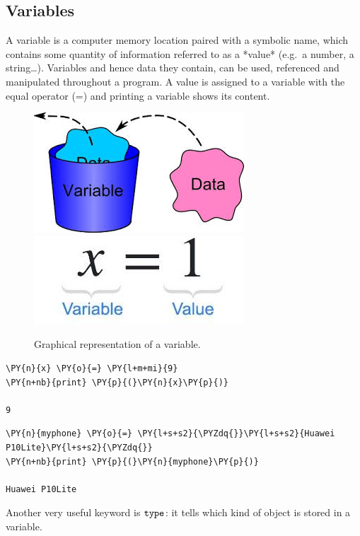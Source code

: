 \subsection{Variables}\label{variables}

A variable is a computer memory location paired with a symbolic name, which contains some quantity of information referred to as a *value* (e.g.~a number, a string\ldots{}). Variables and hence data they contain, can be used, referenced and manipulated throughout a program.
A value is assigned to a variable with the equal operator (=) and printing a variable shows its content. 

\begin{figure}[h]
\centering
\includegraphics[width=0.35\linewidth]{var1.jpeg}\\
\includegraphics[width=0.35\linewidth]{var2.jpeg}
\caption{Graphical representation of a variable.}
\end{figure}

\begin{tcolorbox}[breakable, size=fbox, boxrule=1pt, pad at break*=1mm, colback=cellbackground, colframe=cellborder]
\begin{Verbatim}[commandchars=\\\{\}]
\PY{n}{x} \PY{o}{=} \PY{l+m+mi}{9}
\PY{n+nb}{print} \PY{p}{(}\PY{n}{x}\PY{p}{)}

9
\end{Verbatim}
\end{tcolorbox}

\begin{tcolorbox}[breakable, size=fbox, boxrule=1pt, pad at break*=1mm, colback=cellbackground, colframe=cellborder]
\begin{Verbatim}[commandchars=\\\{\}]
\PY{n}{myphone} \PY{o}{=} \PY{l+s+s2}{\PYZdq{}}\PY{l+s+s2}{Huawei P10Lite}\PY{l+s+s2}{\PYZdq{}}
\PY{n+nb}{print} \PY{p}{(}\PY{n}{myphone}\PY{p}{)}

Huawei P10Lite
\end{Verbatim}
\end{tcolorbox}
\newpage
Another very useful keyword is \(\tt{type}\): it tells which kind of object is stored in a variable.

